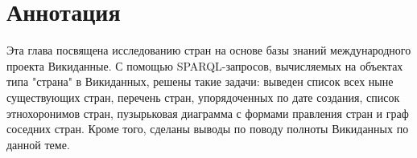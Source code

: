 \chapter*{Аннотация}
Эта глава посвящена исследованию стран на основе базы знаний международного проекта Викиданные. С помощью SPARQL-запросов, вычисляемых на объектах типа "страна" в Викиданных, решены такие задачи: выведен список всех ныне существующих стран, перечень стран, упорядоченных по дате создания, список этнохоронимов стран, пузырьковая диаграмма с формами правления стран и граф соседних стран. Кроме того, сделаны выводы по поводу полноты Викиданных по данной теме.